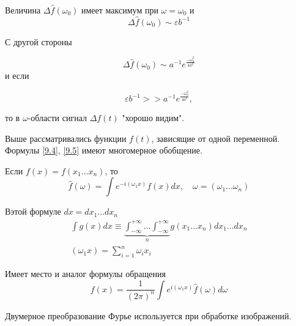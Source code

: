 Величина $\Delta\hat{f}(\omega_0)$ имеет максимум при $\omega = \omega_0$ и 
\begin{equation}\label{9.30}
\Delta\hat{f}(\omega_0) \sim \varepsilon b^{-1}
\end{equation}

С другой стороны  

\begin{equation}\label{9.31}
\Delta\hat{f}(\omega_0) \sim a^{-1} e^{\frac{-\omega_0^2}{4a^2}}
\end{equation}
и если

\begin{equation}\label{32}
\varepsilon b^{-1} >> a^{-1} e^{\frac{-\omega_0^2}{4a^2}},
\end{equation}

то в $\omega$-области сигнал $\Delta f(t)$ "хорошо видим".

Выше рассматривались функции $f(t)$, зависящие от одной переменной.
Формулы \ref{9.4}, \ref{9.5} имеют многомерное обобщение.

Если $f(x) = f(x_1...x_n)$, то
\begin{equation}\label{33}
\hat{f}(\omega) = \int e^{-i(\omega_1 x)}f(x)dx, \quad \omega = (\omega_1 ... \omega_n)
\end{equation}

Вэтой формуле $dx = dx_1...dx_n$
\begin{equation}
\begin{gathered}
\int g(x)dx \equiv  \underbrace{\int_{-\infty}^{+\infty} ...  \int_{-\infty}^{+\infty}}_{n} g(x_1...x_n)dx_1...dx_n\\
(\omega_1 x) = \sum_{i = 1}^{n} \omega_i x_i
\end{gathered}
\end{equation}

Имеет место и аналог формулы обращения
\begin{equation}\label{35}
f(x) = \frac{1}{(2\pi)^n} \int e^{i(\omega_1 x)} \hat{f}(\omega) d\omega
\end{equation}

Двумерное преобразование Фурье используется при обработке изображений.